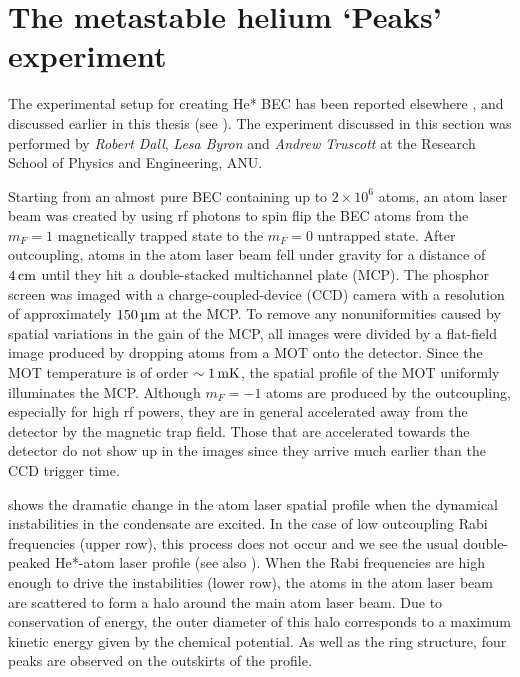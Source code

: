 \section{The metastable helium `Peaks' experiment}
\label{Peaks:ExperimentalSetup}

The experimental setup for creating He* BEC has been reported elsewhere \citep{Dall:2007a}, and discussed earlier in this thesis (see ). The experiment discussed in this section was performed by \emph{Robert Dall}, \emph{Lesa Byron} and \emph{Andrew Truscott} at the Research School of Physics and Engineering, ANU.

Starting from an almost pure BEC containing up to $2\times 10^6$ atoms, an atom laser beam was created by using rf photons to spin flip the BEC atoms from the $m_F=1$ magnetically trapped state to the $m_F=0$ untrapped state.  After outcoupling, atoms in the atom laser beam fell under gravity for a distance of $\unit[4]{cm}$ until they hit a double-stacked multichannel plate (MCP). The phosphor screen was imaged with a charge-coupled-device (CCD) camera with a resolution of approximately $\unit[150]{\micro m}$ at the MCP. To remove any nonuniformities caused by spatial variations in the gain of the MCP, all images were divided by a flat-field image produced by dropping atoms from a MOT onto the detector. Since the MOT temperature is of order $\sim\unit[1]{mK}$, the spatial profile of the MOT uniformly illuminates the MCP. Although $m_F=-1$ atoms are produced by the outcoupling, especially for high rf powers, they are in general accelerated away from the detector by the magnetic trap field. Those that are accelerated towards the detector do not show up in the images since they arrive much earlier than the CCD trigger time.

 shows the dramatic change in the atom laser spatial profile when the dynamical instabilities in the condensate are excited.  In the case of low outcoupling Rabi frequencies (upper row), this process does not occur and we see the usual double-peaked He*-atom laser profile \citep{Dall:2007} (see also ). When the Rabi frequencies are high enough to drive the instabilities (lower row), the atoms in the atom laser beam are scattered to form a halo around the main atom laser beam.  Due to conservation of energy, the outer diameter of this halo corresponds to a maximum kinetic energy given by the chemical potential.  As well as the ring structure, four peaks are observed on the outskirts of the profile.

